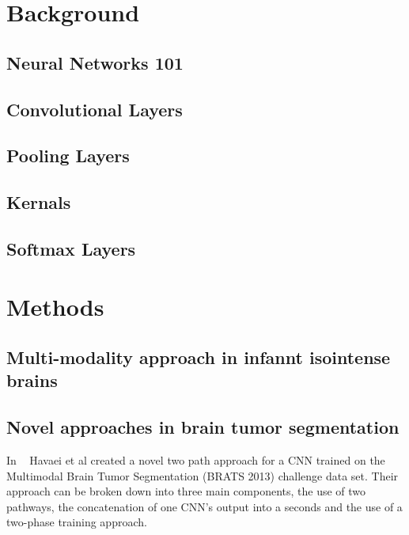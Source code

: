 \documentclass{sig-alternate}
\begin{document}
\section{Background}
\label{sec:background}



\subsection{Neural Networks 101}
\label{sec:neuralNetworks101}


\subsection{Convolutional Layers}
\label{sec:convolutionalLayers}


\subsection{Pooling Layers}
\label{sec:poolingLayers}



\subsection{Kernals}
\label{sec:kernals}


\subsection{Softmax Layers}
\label{sec:softmaxLayers}



\section{Methods}
\label{sec:methods}


\subsection{Multi-modality approach in infannt isointense brains}
\label{sec:multiModality}

\subsection{Novel approaches in brain tumor segmentation}
\label{sec:novelBrainTumorApproach}

In ~\cite{Havaei:2017} Havaei et al created a novel two path approach for a CNN trained on the Multimodal Brain Tumor Segmentation (BRATS 2013) challenge data set. Their approach can be broken down into three main components, the use of two pathways, the concatenation of one CNN's output into a seconds and the use of a two-phase training approach.
\end{document}
